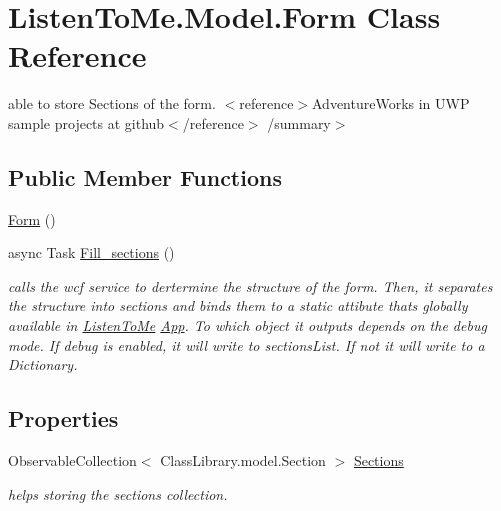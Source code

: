 \hypertarget{class_listen_to_me_1_1_model_1_1_form}{}\section{Listen\+To\+Me.\+Model.\+Form Class Reference}
\label{class_listen_to_me_1_1_model_1_1_form}


able to store Sections of the form. $<$reference$>$Adventure\+Works in U\+WP sample projects at github$<$/reference$>$ /summary$>$  


\subsection*{Public Member Functions}
\begin{DoxyCompactItemize}
\item 
\mbox{\hyperlink{class_listen_to_me_1_1_model_1_1_form_ae0301066625a452b488a25365cf369d0}{Form}} ()
\item 
async Task \mbox{\hyperlink{class_listen_to_me_1_1_model_1_1_form_a97e6f2c705e11c7c99b8742d846d8738}{Fill\+\_\+sections}} ()
\begin{DoxyCompactList}\small\item\em calls the wcf service to dertermine the structure of the form. Then, it separates the structure into sections and binds them to a static attibute that\textquotesingle{}s globally available in \mbox{\hyperlink{namespace_listen_to_me}{Listen\+To\+Me}} \mbox{\hyperlink{class_listen_to_me_1_1_app}{App}}. To which object it outputs depends on the debug mode. If debug is enabled, it will write to sections\+List. If not it will write to a Dictionary. \end{DoxyCompactList}\end{DoxyCompactItemize}
\subsection*{Properties}
\begin{DoxyCompactItemize}
\item 
Observable\+Collection$<$ Class\+Library.\+model.\+Section $>$ \mbox{\hyperlink{class_listen_to_me_1_1_model_1_1_form_a5ecdd2a344e3e2e6157ff3c5b6dfc2d1}{Sections}}
\begin{DoxyCompactList}\small\item\em helps storing the sections collection. \end{DoxyCompactList}\end{DoxyCompactItemize}
